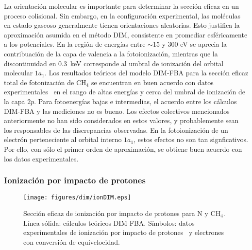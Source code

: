La orientación molecular es importante para determinar la sección eficaz 
en un proceso colisional. Sin embargo, en la configuración experimental, 
las moléculas en estado gaseoso generalmente tienen orientaciones 
aleatorias. Esto justifica la aproximación asumida en el método DIM, 
consistente en promediar esféricamente a los potenciales. En la región 
de energías entre $\sim$15 y 300 eV se aprecia la contribuación de la 
capa de valencia a la fotoionización, mientras que la discontinuidad en 
$0.3$~keV corresponde al umbral de ionización del orbital molecular 
$1a_1$. Los resultados teóricos del modelo DIM-FBA para la sección 
eficaz total de fotonización de CH$_4$ se encuentran en buen acuerdo con 
datos experimentales~\cite{Lukirskii:64,Henke:82,Samson:89} en el 
rango de altas energías y cerca del umbral de ionización de la capa 
$2p$. Para fotoenergías bajas e intermedias, el acuerdo entre los
cálculos DIM-FBA y las mediciones no es bueno. Los efectos 
colectivos mencionados anteriormente no han sido considerados en estos 
valores, y probablemente sean los responsables de las discrepancias 
observadas. En la fotoionización de un electrón perteneciente al orbital 
interno $1a_1$, estos efectos no son tan signficativos. Por ello, con 
sólo el primer orden de aproximación, se obtiene buen acuerdo con los 
datos experimentales. 

\subsubsection{Ionización por impacto de protones}

\begin{figure}[t]
\centering
\texttt{[image: figures/dim/ionDIM.eps]}
\caption[Ionización por impacto de protón de N y CH$_4$.]
{Sección eficaz de ionización por impacto de protones para N y 
CH$_4$. Línea sólida: cálculos teóricos DIM-FBA. Símbolos: datos 
experimentales de ionización por impacto de 
protones~\cite{Rudd:83,Rudd:85} y electrones~\cite{Brook:78} con 
conversión de equivelocidad.}
\label{fig:iondim}
\end{figure}

